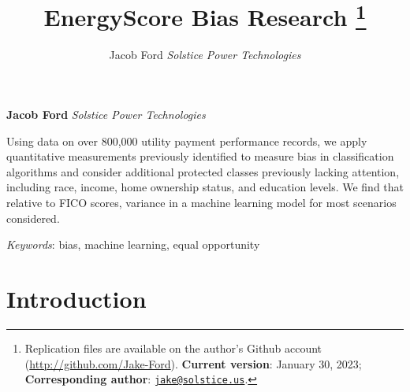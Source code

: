 \documentclass[11pt,]{article}
\title{EnergyScore Bias Research \thanks{Replication files are available
on the author's Github account (\url{http://github.com/Jake-Ford}).
\textbf{Current version}: January 30, 2023; \textbf{Corresponding
author}:
\href{mailto:jake@solstice.us}{\nolinkurl{jake@solstice.us}}.}  }
\author{\Large Jacob
Ford\vspace{0.05in} \newline\normalsize\emph{Solstice Power
Technologies}  }
\date{}
\newcommand*{\authorfont}{\fontfamily{phv}\selectfont}
\renewenvironment{abstract}
 {{%
    \setlength{\leftmargin}{0mm}
    \setlength{\rightmargin}{\leftmargin}%
  }%
  \relax}
 {\endlist}
\begin{document}
	
%    


{%
\setlength{\parindent}{0pt}
\thispagestyle{plain}
{\fontsize{18}{20}\selectfont\raggedright 
\maketitle  %

}

{
   \vskip 13.5pt\relax \normalsize\fontsize{11}{12} 
\textbf{\authorfont Jacob Ford} \hskip 15pt \emph{\small Solstice Power
Technologies}   

}

}








\begin{abstract}

    \hbox{\vrule height .2pt width 39.14pc}

    \vskip 8.5pt %

\noindent Using data on over 800,000 utility payment performance
records, we apply quantitative measurements previously identified to
measure bias in classification algorithms and consider additional
protected classes previously lacking attention, including race, income,
home ownership status, and education levels. We find that relative to
FICO scores, variance in a machine learning model for most scenarios
considered.


\vskip 8.5pt \noindent \emph{Keywords}: bias, machine learning, equal
opportunity \par

    \hbox{\vrule height .2pt width 39.14pc}



\end{abstract}


\vskip -8.5pt



\noindent  

\hypertarget{introduction}{%
\section{Introduction}\label{introduction}}
\end{document}
